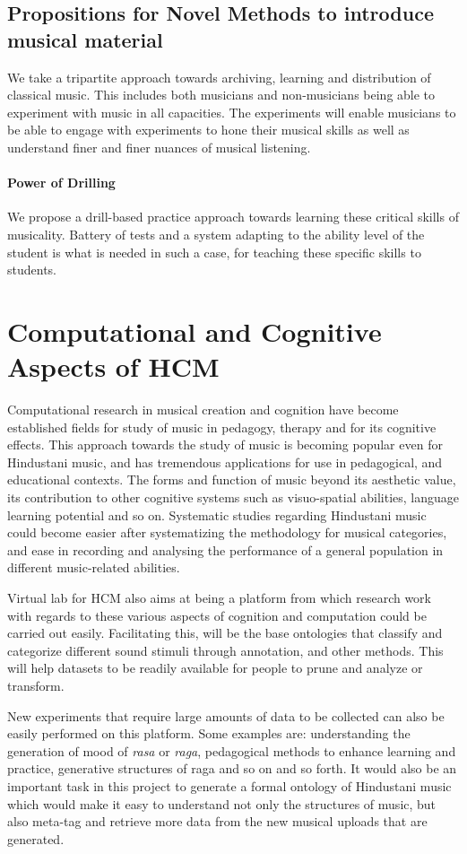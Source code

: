\documentclass{tufte-handout}
\begin{document}
\subsection{Propositions for Novel Methods to introduce musical material}
We take a tripartite approach towards archiving, learning and distribution of classical music. This includes both musicians and non-musicians being able to experiment with music in all capacities. The experiments will enable musicians to be able to engage with experiments to hone their musical skills as well as understand finer and finer nuances of musical listening. 
\paragraph{Power of Drilling} We propose a drill-based practice approach towards learning these critical skills of musicality. Battery of tests and a system adapting to the ability level of the student is what is needed in such a case, for teaching these specific skills to students. 

\section{Computational and Cognitive Aspects of HCM}
Computational research in musical creation and cognition have become established fields for study of music in pedagogy, therapy and for its cognitive effects. This approach towards the study of music is becoming popular even for Hindustani music, and has tremendous applications for use in pedagogical, and educational contexts. The forms and function of music beyond its aesthetic value, its contribution to other cognitive systems such as visuo-spatial abilities, language learning potential and so on. Systematic studies regarding Hindustani music could become easier after systematizing the methodology for musical categories, and ease in recording and analysing the performance of a general population in different music-related abilities.  

Virtual lab for HCM also aims at being a platform from which research work with regards to these various aspects of cognition and computation could be carried out easily. Facilitating this, will be the base ontologies that classify and categorize different sound stimuli through annotation, and other methods. This will help datasets to be readily available for people to prune and analyze or transform. 

New experiments that require large amounts of data to be collected can also be easily performed on this platform. Some examples are: understanding the generation of mood of
\emph{rasa} or \emph{raga}, pedagogical
methods to enhance learning and practice, generative
structures of raga and so on and so forth. It would also be
an important task in this project to generate a formal
ontology of Hindustani music which would make it easy to
understand not only the structures of music, but also
meta-tag and retrieve more data from the new musical uploads
that are generated.
\end{document}
